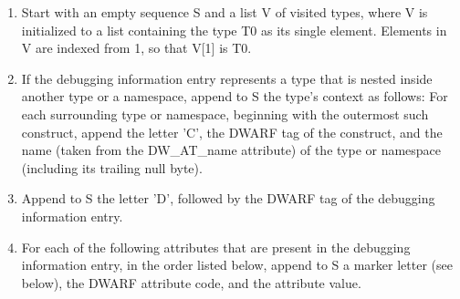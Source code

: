 \begin{enumerate}[1.]

\item Start with an empty sequence S and a list V of visited
types, where V is initialized to a list containing the type
T0 as its single element. Elements in V are indexed from 1,
so that V[1] is T0.

\item If the debugging information entry represents a type that
is nested inside another type or a namespace, append to S
the type’s context as follows: For each surrounding type
or namespace, beginning with the outermost such construct,
append the letter 'C', the DWARF tag of the construct, and
the name (taken from the DW\-\_AT\-\_name attribute) of the type
or namespace (including its trailing null byte).

\item  Append to S the letter 'D', followed by the DWARF tag of
the debugging information entry.

\item For each of the following attributes that are present in
the debugging information entry, in the order listed below,
append to S a marker letter (see below), the DWARF attribute
code, and the attribute value.


\end{enumerate}
